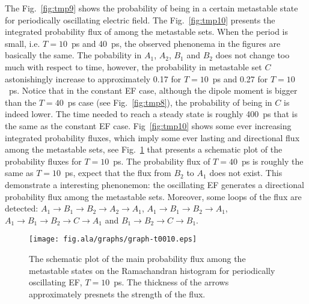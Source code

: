 \documentclass[aip,jcp,a4paper,preprint,onecolumn]{revtex4-1}
\begin{document}
The Fig.~\ref{fig:tmp9} shows the probability of being in a certain
metastable state for periodically oscillating electric field.  The
Fig.~\ref{fig:tmp10} presents the integrated probability flux of among
the metastable sets.
When the period is small, i.e. $T=10$~ps and
40~ps, the observed phenonema in the figures are basically the same.
The pobability in $A_1$, $A_2$, $B_1$ and $B_2$ does not change
too much with respect to time,
however, the probability in metastable set $C$ astonishingly
increase to approximately 0.17 for $T=10$~ps  and 0.27 for  $T=10$~ps.
Notice that in the constant EF case, although the dipole moment is
bigger than the  $T=40$~ps case (see Fig.~\ref{fig:tmp8}), the
probability of being in $C$ is indeed lower.  
The time needed to reach a steady state is
roughly 400~ps that is the same as the
constant EF case. Fig~\ref{fig:tmp10} shows some ever increasing
integrated probability fluxes, which imply some ever lasting and directional
flux among the metastable sets, see
Fig.~\ref{fig:tmp11} that presents a schematic plot of the probability
fluxes for $T=10$~ps. The probability flux of  $T=40$~ps is roughly
the same as $T=10$~ps, expect that
the flux from $B_2 $ to $A_1$ does not exist. 
This demonstrate a interesting phenonemon: the oscillating EF 
generates a directional probability flux among the metastable sets.
Moreover, some loops of the flux are detected: $A_1 \rightarrow B_1
\rightarrow B_2 \rightarrow A_2 \rightarrow A_1$, $A_1 \rightarrow B_1
\rightarrow B_2 \rightarrow A_1$,  $A_1 \rightarrow B_1
\rightarrow B_2 \rightarrow C \rightarrow A_1$ and $B_1
\rightarrow B_2 \rightarrow C \rightarrow B_1$.

\begin{figure}
  \centering
  \texttt{[image: fig.ala/graphs/graph-t0010.eps]}
  \caption{The schematic plot of the main probability flux among the metastable
    states on the Ramachandran histogram
    for periodically oscillating EF, $T=10$~ps. The thickness 
    of the arrows approximately presnets the strength of the flux.
  }
  \label{fig:tmp11}
\end{figure}
\end{document}
